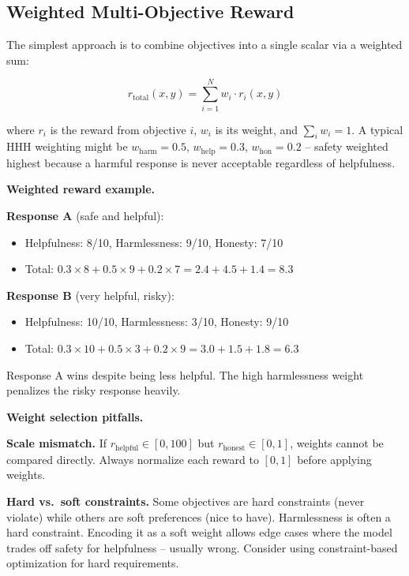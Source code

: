 \begin{chapterenv}
\section{Weighted Multi-Objective Reward}

The simplest approach is to combine objectives into a single scalar via a weighted sum:

$$r_{\text{total}}(x, y) = \sum_{i=1}^{N} w_i \cdot r_i(x, y)$$

where $r_i$ is the reward from objective $i$, $w_i$ is its weight, and $\sum_i w_i = 1$. A typical HHH weighting might be $w_{\text{harm}} = 0.5$, $w_{\text{help}} = 0.3$, $w_{\text{hon}} = 0.2$ -- safety weighted highest because a harmful response is never acceptable regardless of helpfulness.

\begin{infobox}
\textbf{Weighted reward example.}

\textbf{Response A} (safe and helpful):
\begin{itemize}
\item Helpfulness: 8/10, Harmlessness: 9/10, Honesty: 7/10
\item Total: $0.3 \times 8 + 0.5 \times 9 + 0.2 \times 7 = 2.4 + 4.5 + 1.4 = 8.3$
\end{itemize}

\textbf{Response B} (very helpful, risky):
\begin{itemize}
\item Helpfulness: 10/10, Harmlessness: 3/10, Honesty: 9/10
\item Total: $0.3 \times 10 + 0.5 \times 3 + 0.2 \times 9 = 3.0 + 1.5 + 1.8 = 6.3$
\end{itemize}

Response A wins despite being less helpful. The high harmlessness weight penalizes the risky response heavily.
\end{infobox}

\begin{tipbox}
\textbf{Weight selection pitfalls.}

\textbf{Scale mismatch.} If $r_{\text{helpful}} \in [0, 100]$ but $r_{\text{honest}} \in [0, 1]$, weights cannot be compared directly. Always normalize each reward to $[0, 1]$ before applying weights.

\textbf{Hard vs.\ soft constraints.} Some objectives are hard constraints (never violate) while others are soft preferences (nice to have). Harmlessness is often a hard constraint. Encoding it as a soft weight allows edge cases where the model trades off safety for helpfulness -- usually wrong. Consider using constraint-based optimization for hard requirements.


\end{tipbox}
\end{chapterenv}
